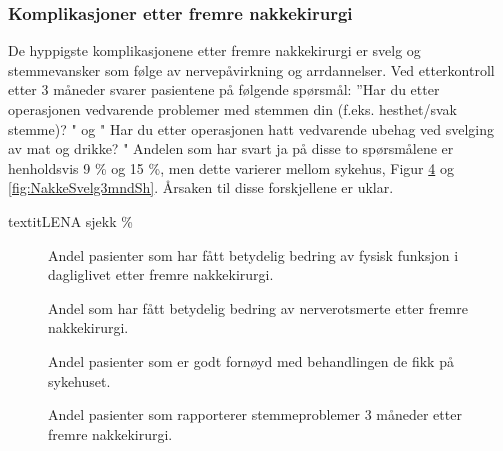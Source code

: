 \documentclass [norsk,a4paper,twoside]{article}\usepackage[]{graphicx}\usepackage[]{color}
\begin{document}
            \subsubsection{Komplikasjoner etter fremre nakkekirurgi}
            De hyppigste komplikasjonene etter fremre nakkekirurgi er svelg og stemmevansker som følge 
            av nervepåvirkning og arrdannelser. Ved etterkontroll etter 3 måneder svarer pasientene på
            følgende spørsmål: ''Har du etter operasjonen vedvarende problemer med stemmen din 
            (f.eks. hesthet/svak stemme)? " og " Har du etter operasjonen hatt vedvarende ubehag ved svelging av mat og drikke? "
            Andelen som har svart ja på disse to spørsmålene er henholdsvis 9 \% og 15 \%, men dette  varierer mellom sykehus, Figur \ref{fig:NakkeStemme3mndSh} og \ref{fig:NakkeSvelg3mndSh}. Årsaken til disse forskjellene er uklar. 
            
            textit{LENA sjekk \%}
            
            
            
            \begin{figure}[ht]
            \caption{\label{fig:NakkeNDIendr12mndUmFSh} Andel pasienter som har fått betydelig bedring av fysisk funksjon i dagliglivet etter fremre nakkekirurgi.}
            \end{figure}
            
            \begin{figure}[ht]
            \caption{\label{fig:NakkeNRSsmerteArmEndr12mndUmFSh} Andel som har fått betydelig bedring av nerverotsmerte  etter fremre nakkekirurgi.}
            \end{figure}
            
            \begin{figure}[ht]
            \caption{\label{fig:NakkeFornoydBeh12mndFremSh} Andel pasienter som er godt fornøyd med behandlingen de fikk på sykehuset.}
            \end{figure}
            
            \begin{figure}[ht]
            \caption{\label{fig:NakkeStemme3mndSh} Andel pasienter som rapporterer stemmeproblemer 3 måneder etter fremre nakkekirurgi.}
            \end{figure}
            
\end{document}
